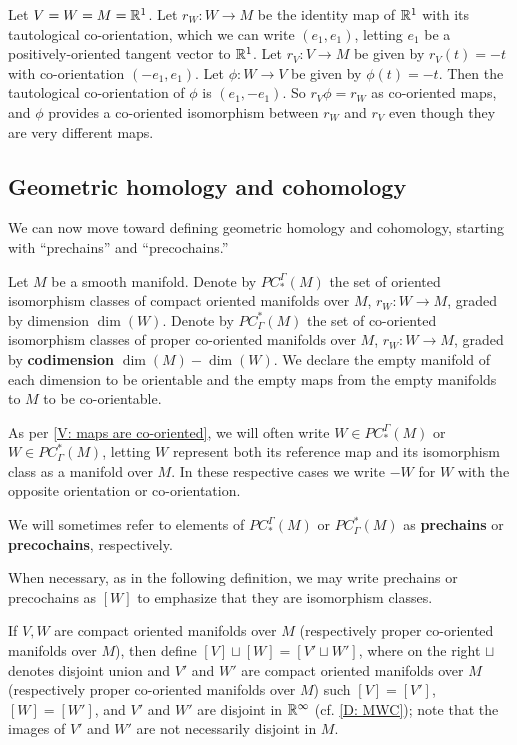 \begin{example}
	Let $V = W = M = \mathbb{R}^1$.
	Let $r_W \colon W \to M$ be the identity map of $\mathbb{R}^1$ with its tautological co-orientation, which we can write $(e_1,e_1)$, letting $e_1$ be a positively-oriented tangent vector to $\mathbb{R}^1$.
	Let $r_V \colon V \to M$ be given by $r_V(t) = -t$ with co-orientation $(-e_1,e_1)$.
	Let $\phi \colon W \to V$ be given by $\phi(t) = -t$.
	Then the tautological co-orientation of $\phi$ is $(e_1,-e_1)$.
	So $r_V\phi = r_W$ as co-oriented maps, and $\phi$ provides a co-oriented isomorphism between $r_W$ and $r_V$ even though they are very different maps.
\end{example}

\subsection{Geometric homology and cohomology}

We can now move toward defining geometric homology and cohomology, starting with ``prechains'' and ``precochains.''

\begin{definition}
	Let $M$ be a smooth manifold. 
	Denote by $PC^\Gamma_*(M)$ the set of oriented isomorphism classes of compact oriented manifolds over $M$, $r_W \colon W \to M$,
	graded by dimension $\dim(W)$.
	Denote by $PC_\Gamma^*(M)$ the set of co-oriented isomorphism classes of proper co-oriented manifolds over $M$, $r_W \colon W \to M$,
	graded by \textbf{codimension} $\dim(M) - \dim(W)$.
	We declare the empty manifold of each dimension to be orientable and the empty maps from the empty manifolds to $M$ to be co-orientable.

	As per \cref{V: maps are co-oriented}, we will often write $W \in PC^\Gamma_*(M)$ or $W \in PC_\Gamma^*(M)$, letting $W$ represent both its reference map and its isomorphism class as a manifold over $M$.
	In these respective cases we write $-W$ for $W$ with the opposite orientation or co-orientation.

	We will sometimes refer to elements of $PC^\Gamma_*(M)$ or $PC_\Gamma^*(M)$ as \textbf{prechains} or \textbf{precochains}, respectively.
\end{definition}

When necessary, as in the following definition, we may write prechains or precochains as $[W]$ to emphasize that they are isomorphism classes.


\begin{definition}\label{D: prechain sum}
	If $V,W$ are compact oriented manifolds over $M$ (respectively proper co-oriented manifolds over $M$), then define $[V] \sqcup [W] = [V' \sqcup W']$, where on the right $\sqcup$ denotes disjoint union and $V'$ and $W'$ are compact oriented manifolds over $M$ (respectively proper co-oriented manifolds over $M$) such $[V]=[V']$, $[W]=[W']$, and $V'$ and $W'$ are disjoint in $\mathbb{R}^\infty$ (cf.
	\cref{D: MWC}); note that the images of $V'$ and $W'$ are not necessarily disjoint in $M$.
\end{definition}

